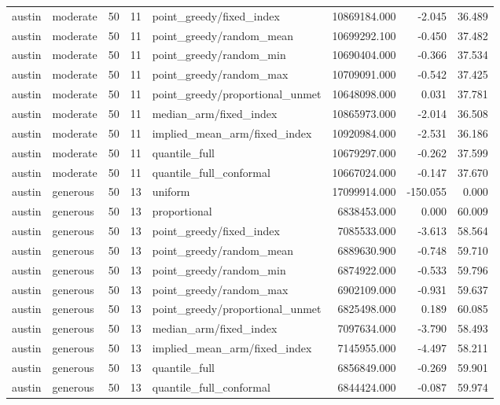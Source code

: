 \begin{tabular}{llrrlrrr}
austin & moderate & 50 & 11 & point\_greedy/fixed\_index & 10869184.000 & -2.045 & 36.489 \\
austin & moderate & 50 & 11 & point\_greedy/random\_mean & 10699292.100 & -0.450 & 37.482 \\
austin & moderate & 50 & 11 & point\_greedy/random\_min & 10690404.000 & -0.366 & 37.534 \\
austin & moderate & 50 & 11 & point\_greedy/random\_max & 10709091.000 & -0.542 & 37.425 \\
austin & moderate & 50 & 11 & point\_greedy/proportional\_unmet & 10648098.000 & 0.031 & 37.781 \\
austin & moderate & 50 & 11 & median\_arm/fixed\_index & 10865973.000 & -2.014 & 36.508 \\
austin & moderate & 50 & 11 & implied\_mean\_arm/fixed\_index & 10920984.000 & -2.531 & 36.186 \\
austin & moderate & 50 & 11 & quantile\_full & 10679297.000 & -0.262 & 37.599 \\
austin & moderate & 50 & 11 & quantile\_full\_conformal & 10667024.000 & -0.147 & 37.670 \\
austin & generous & 50 & 13 & uniform & 17099914.000 & -150.055 & 0.000 \\
austin & generous & 50 & 13 & proportional & 6838453.000 & 0.000 & 60.009 \\
austin & generous & 50 & 13 & point\_greedy/fixed\_index & 7085533.000 & -3.613 & 58.564 \\
austin & generous & 50 & 13 & point\_greedy/random\_mean & 6889630.900 & -0.748 & 59.710 \\
austin & generous & 50 & 13 & point\_greedy/random\_min & 6874922.000 & -0.533 & 59.796 \\
austin & generous & 50 & 13 & point\_greedy/random\_max & 6902109.000 & -0.931 & 59.637 \\
austin & generous & 50 & 13 & point\_greedy/proportional\_unmet & 6825498.000 & 0.189 & 60.085 \\
austin & generous & 50 & 13 & median\_arm/fixed\_index & 7097634.000 & -3.790 & 58.493 \\
austin & generous & 50 & 13 & implied\_mean\_arm/fixed\_index & 7145955.000 & -4.497 & 58.211 \\
austin & generous & 50 & 13 & quantile\_full & 6856849.000 & -0.269 & 59.901 \\
austin & generous & 50 & 13 & quantile\_full\_conformal & 6844424.000 & -0.087 & 59.974 \\

\end{tabular}
